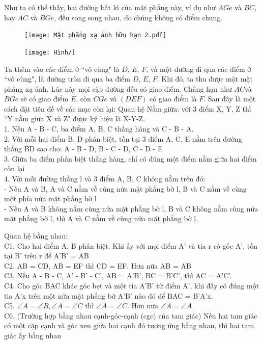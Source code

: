 \begin{multicols}{2}
	Như ta có thể thấy, hai đường bất kì của mặt phẳng này, ví dụ như $AGe$ và $BC$, hay $AC$ và $BGe$, đều song song nhau, do chúng không có điểm chung. 
	\begin{figure}[H]
		\vspace*{-5pt}
		\centering
		\captionsetup{labelformat= empty, justification=centering}
		\texttt{[image: Mặt phẳng xạ ảnh hữu hạn 2.pdf]}
		\vspace*{-10pt}
	\end{figure}
	\begin{figure}[ht]
		\texttt{[image: Hình/]}
	\end{figure}
	Ta thêm vào các điểm ở ``vô cùng" là $D$, $E$, $F$, và một đường đi qua các điểm ở ``vô cùng", là đường tròn đi qua ba điểm $D$, $E$, $F$. Khi đó, ta thu được một mặt phẳng xạ ảnh. Lúc này mọi cặp đường đều có giao điểm. Chẳng hạn như $AC$và $BGe$ sẽ có giao điểm $E$, còn $CGe$ và $(DEF)$ có giao điểm là $F$.
	\vskip 0.1cm
	Sau đây là một cách đặt tiên đề về các mục còn lại: 
	\vskip 0.1cm
	Quan hệ Nằm giữa: với 3 điểm X, Y, Z thì ``Y nằm giữa X và Z" được ký hiệu là X-Y-Z.\\
	1. Nếu A - B - C, ba điểm A, B, C thẳng hàng và C - B - A. \\
	2. Với mỗi hai điểm B, D phân biệt, tồn tại 3 điểm A, C, E nằm trên đường thẳng BD sao cho: A - B - D, B - C - D, C - D - E \\
	3. Giữa ba điểm phân biệt thẳng hàng, chỉ có đúng một điểm nằm giữa hai điểm còn lại \\
	4. Với mỗi đường thẳng l và 3 điểm A, B, C không nằm trên đó: \\
	- Nếu A và B, A và C nằm về cùng nửa mặt phẳng bờ l, B và C nằm về cùng một phía nửa mặt phẳng bờ l \\
	- Nếu A và B không nằm cùng nửa mặt phẳng bờ l, B và C không nằm cùng nửa mặt phẳng bờ l, thì A và C nằm về cùng nửa mặt phẳng bờ l.
	
	Quan hệ bằng nhau: \\
	C1. Cho hai điểm A, B phân biệt. Khi ấy với mọi điểm A' và tia r có gốc A', tồn tại B' trên r để A'B' = AB \\
	C2. AB = CD, AB = EF thì CD = EF. Hơn nữa AB = AB \\
	C3. Nếu A - B - C, A' - B' - C', AB = A'B', BC = B'C', thì AC = A'C'. \\
	C4. Cho góc BAC khác góc bẹt và một tia A'B' từ điểm A', khi đấy có đúng một tia A'x trên một nửa mặt phẳng bờ A'B' nào đó để BAC = B'A'x.\\
	C5. $ \angle A = \angle B, \angle A = \angle C$ thì $ \angle A = \angle C$. Hơn nữa $ \angle A = \angle A$ \\
	C6. (Trường hợp bằng nhau cạnh-góc-cạnh (cgc) của tam giác) Nếu hai tam giác có một cặp cạnh và góc xen giữa hai cạnh đó tương ứng bằng nhau, thì hai tam giác ấy bằng nhau \\
	

\end{multicols}
